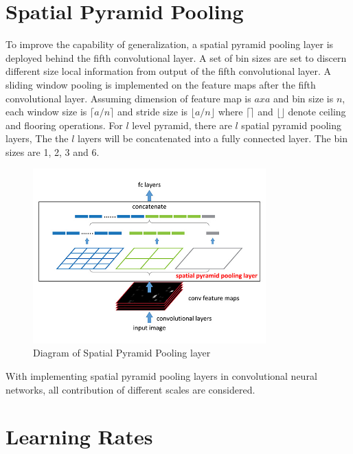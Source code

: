 \section{Spatial Pyramid Pooling}

To improve the capability of generalization, a spatial pyramid pooling layer is deployed behind the fifth convolutional layer. A set of bin sizes are set to discern different size local information from output of the fifth convolutional layer.  A sliding window pooling  is implemented on the feature maps after the fifth convolutional layer. Assuming dimension of feature map is $axa$ and bin size is $n$, each window size is $\lceil a/n \rceil$ and stride size is $\lfloor a/n \rfloor$ where $\lceil \rceil$ and $\lfloor \rfloor$ denote ceiling and flooring operations. For $l$ level pyramid, there are $l$ spatial pyramid pooling layers, The the $l$ layers will be concatenated into a fully connected layer. The bin sizes are 1, 2, 3 and 6.

\begin{figure}[!htb]
    \centering
	\includegraphics[width=0.8\textwidth]{sppnet.jpg}
    \caption{Diagram of Spatial Pyramid Pooling layer}%
    \label{fig:sppnet}%
\end{figure}

With implementing spatial pyramid pooling layers in convolutional neural networks, all contribution of different scales are considered. 

\section{Learning Rates}















